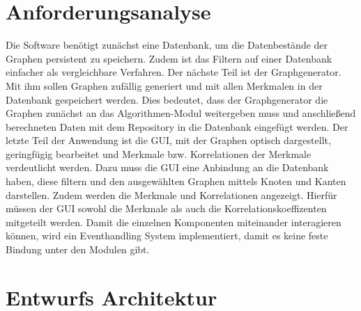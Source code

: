 \documentclass[13pt]{scrreprt}
\begin{document}
\chapter{Anforderungsanalyse}
Die Software benötigt zunächst eine Datenbank, um die Datenbestände der Graphen persistent zu speichern. Zudem ist das Filtern auf einer Datenbank einfacher als vergleichbare Verfahren.
Der nächste Teil ist der Graphgenerator. Mit ihm sollen Graphen zufällig generiert und mit allen Merkmalen in der Datenbank gespeichert werden. Dies bedeutet, dass der Graphgenerator die Graphen zunächst an das Algorithmen-Modul weitergeben muss und anschließend berechneten Daten mit dem Repository in die Datenbank eingefügt werden.
Der letzte Teil der Anwendung ist die GUI, mit der Graphen optisch dargestellt, geringfügig bearbeitet und Merkmale bzw. Korrelationen der Merkmale verdeutlicht werden. Dazu muss die GUI eine Anbindung an die Datenbank haben, diese filtern und den ausgewählten Graphen mittels Knoten und Kanten darstellen.
Zudem werden die Merkmale und Korrelationen angezeigt. Hierfür müssen der GUI sowohl die Merkmale als auch die Korrelationskoeffizenten mitgeteilt werden.
Damit die einzelnen Komponenten miteinander interagieren können, wird ein Eventhandling System implementiert, damit es keine feste Bindung unter den Modulen gibt.

\chapter{Entwurfs Architektur}
\end{document}
